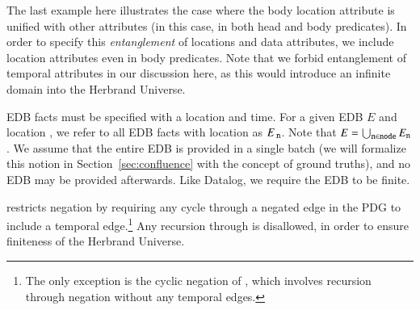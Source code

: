 The last example
here illustrates the case where the body location attribute is unified with other attributes (in this case, in both head and body predicates).  In order to specify this \textit{entanglement} of locations and data attributes, we include location attributes even in body predicates. 
Note that we forbid entanglement of temporal attributes in our discussion here, as this would introduce an infinite domain into the Herbrand Universe.


\vspace{1em}
EDB facts must be specified with a location and time.  For a given EDB $E$ and location , we refer to all EDB facts with location  as $E_{\text{ \dedalus{{\scriptsize n}}}}$.  Note that $E = \bigcup_{\text{\dedalus{{\scriptsize n}}} \in \text{\dedalus{{\scriptsize node}}}} E_{\text{\dedalus{{\scriptsize n}}}}$.  We assume that the entire EDB is provided in a single batch
(we will formalize this notion in Section~\ref{sec:confluence} with the concept of
ground truths), and no EDB may be provided afterwards.  Like Datalog, we require the EDB to be finite.

\vspace{1em}
\lang restricts negation by requiring any cycle through a negated edge in the PDG to include a temporal edge.\footnote{The only exception is the cyclic negation of , which involves recursion through negation without any temporal edges.}  Any recursion through  is disallowed, in order to ensure finiteness of the Herbrand Universe.  %



